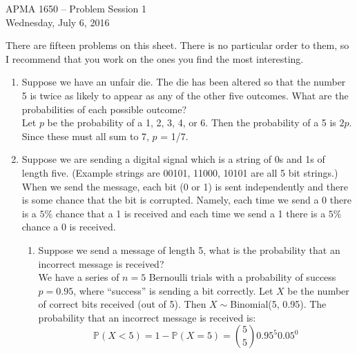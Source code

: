 \documentclass[12pt]{article}
\def\P{{\mathbb P}}
\begin{document}
\title{}
\author{\vspace{-10ex} }

\begin{center}
{\LARGE APMA 1650 -- Problem Session 1}\\
\vspace{5mm}
{\large Wednesday, July 6, 2016}\\
\end{center}

There are fifteen problems on this sheet. There is no particular order to them, so I recommend that you work on the ones you find the most interesting.

\begin{enumerate}

\item Suppose we have an unfair die. The die has been altered so that the number 5 is twice as likely to appear as any of the other five outcomes. What are the probabilities of each possible outcome?\\

Let $p$ be the probability of a 1, 2, 3, 4, or 6. Then the probability of a 5 is $2p$. Since these must all sum to 7, $p$ = 1/7.

\item Suppose we are sending a digital signal which is a string of 0s and 1s of length five. (Example strings are 00101, 11000, 10101 are all 5 bit strings.) When we send the message, each bit (0 or 1) is sent independently and there is some chance that the bit is corrupted. Namely, each time we send a 0 there is a $5\%$ chance that a 1 is received and each time we send a 1 there is a $5\%$ chance a 0 is received.\\
\begin{enumerate}
\item Suppose we send a message of length 5, what is the probability that an incorrect message is received?\\

We have a series of $n = 5$ Bernoulli trials with a probability of success $p = 0.95$, where ``success'' is sending a bit correctly. Let $X$ be the number of correct bits received (out of 5). Then $X \sim $Binomial(5, 0.95). The probability that an incorrect message is received is:
\[
\P(X < 5) = 1 - \P(X = 5) = \binom{5}{5}0.95^5 0.05^0
\]


\end{enumerate}
\end{enumerate}
\end{document}
